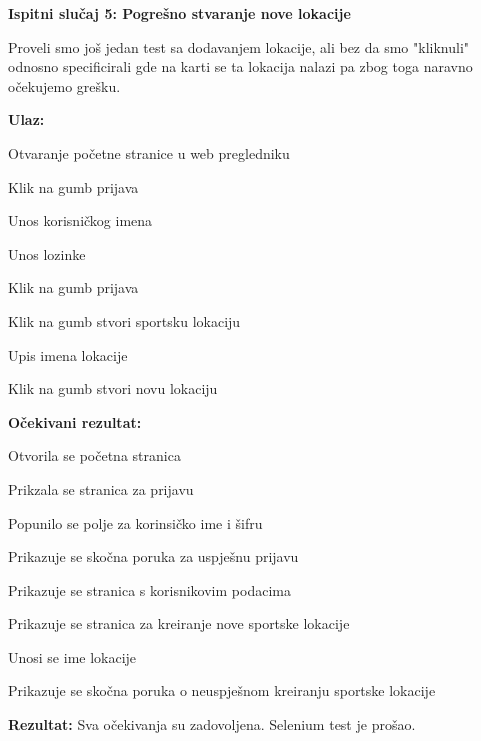 		\hfill\break
		\noindent\textbf{Ispitni slučaj 5: Pogrešno stvaranje nove lokacije}
		
		Proveli smo  još jedan test sa dodavanjem lokacije, ali bez da smo "kliknuli" odnosno specificirali gde na karti se ta lokacija nalazi pa zbog toga naravno očekujemo grešku.
		
		\hfill\break
		\noindent\textbf{Ulaz:}
		
		\begin{packed_enum}
			
				\item Otvaranje početne stranice u web pregledniku
			 	\item Klik na gumb prijava
			 	\item Unos korisničkog imena
			 	\item Unos lozinke
			 	\item Klik na gumb prijava
			 	\item Klik na gumb stvori sportsku lokaciju
			 	\item Upis imena lokacije
			 	\item Klik na gumb stvori novu lokaciju
			
		\end{packed_enum}
		
		\noindent\textbf{Očekivani rezultat:}
		
		\begin{packed_enum}
			
				\item Otvorila se početna stranica
			 	\item Prikzala se stranica za prijavu
			 	\item Popunilo se polje za korinsičko ime i šifru
			 	\item Prikazuje se skočna poruka za uspješnu prijavu
			 	\item Prikazuje se stranica s korisnikovim podacima
			 	\item Prikazuje se stranica za kreiranje nove sportske lokacije
			 	\item Unosi se ime lokacije
			 	\item Prikazuje se skočna poruka o neuspješnom kreiranju sportske lokacije
			
		\end{packed_enum}
		
		\noindent\textbf{Rezultat:} Sva očekivanja su zadovoljena. Selenium test je prošao.
		
